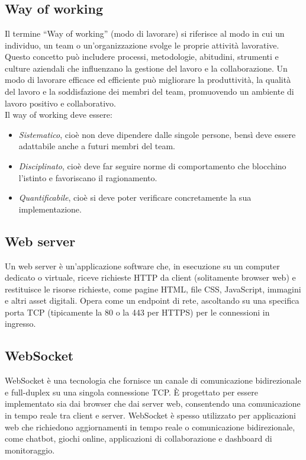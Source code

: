 
\section{}

\hypertarget{sec:way_of_working}{}
\subsection*{Way of working}
Il termine “Way of working” (modo di lavorare) si riferisce al modo in cui un individuo, un team o un’organizzazione svolge le proprie attività lavorative. 
Questo concetto può includere processi, metodologie, abitudini, strumenti e culture aziendali che influenzano la gestione del lavoro e la collaborazione. 
Un modo di lavorare efficace ed efficiente può migliorare la produttività, la qualità del lavoro e la soddisfazione dei membri del team, promuovendo un 
ambiente di lavoro positivo e collaborativo. \\
Il way of working deve essere:
\begin{itemize}
    \item \emph{Sistematico}, cioè non deve dipendere dalle singole persone, bensì deve essere adattabile anche a futuri membri del team.
    \item \emph{Disciplinato}, cioè deve far seguire norme di comportamento che blocchino l'istinto e favoriscano il ragionamento.
    \item \emph{Quantificabile}, cioè si deve poter verificare concretamente la sua implementazione.
\end{itemize}

\hypertarget{sec:web_server}{}
\subsection*{Web server}
Un web server è un'applicazione software che, in esecuzione su un computer dedicato o virtuale, riceve richieste HTTP da client 
(solitamente browser web) e restituisce le risorse richieste, come pagine HTML, file CSS, JavaScript, immagini e altri asset digitali. 
Opera come un endpoint di rete, ascoltando su una specifica porta TCP (tipicamente la 80 o la 443 per HTTPS) per le connessioni in 
ingresso.

\hypertarget{sec:websocket}{}
\subsection*{WebSocket}
WebSocket è una tecnologia che fornisce un canale di comunicazione bidirezionale e full-duplex su una singola connessione TCP.
È progettato per essere implementato sia dai browser che dai server web, consentendo una comunicazione in tempo reale tra client e server.
WebSocket è spesso utilizzato per applicazioni web che richiedono aggiornamenti in tempo reale o comunicazione bidirezionale, come chatbot, giochi online,
applicazioni di collaborazione e dashboard di monitoraggio.

